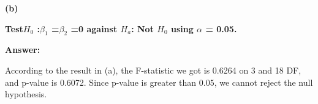 \documentclass[letterpaper,11pt]{article}
\begin{document}
\bigbreak
\begin{addmargin}[-1.1em]{0em}
\textbf{(b)}\par\end{addmargin}
\textbf{Test$H_0$ :$\beta_1$ =$\beta_2$ =0 against $H_a$: Not $H_0$ using $\alpha$ = 0.05.}\par
\bigbreak
\begin{addmargin}[-0.5em]{0em}
\textbf{Answer: }\end{addmargin}

According to the result in (a), the F-statistic we got is 0.6264 on 3 and 18 DF, and p-value is 0.6072. Since p-value is greater than 0.05, we cannot reject the null hypothesis.
\bigbreak
\end{document}
